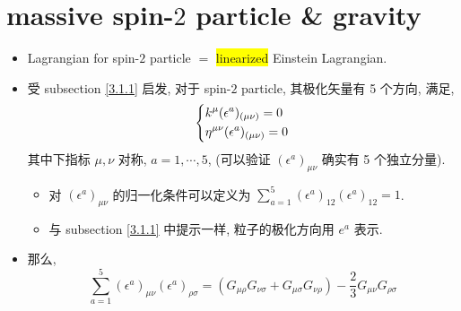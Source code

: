 \section{massive spin-\texorpdfstring{$2$}{2} particle \& gravity}
\begin{itemize}
	\item Lagrangian for spin-$2$ particle $=$ \colorbox{yellow}{linearized} Einstein Lagrangian.
	
	\item 受 subsection \ref{3.1.1} 启发, 对于 spin-$2$ particle, 其极化矢量有 5 个方向, 满足,
	\begin{equation} \label{3.2.1}
		\begin{dcases}
			k^\mu (\epsilon^a)_{(\mu \nu)} = 0 \\
			\eta^{\mu \nu} (\epsilon^a)_{(\mu \nu)} = 0
		\end{dcases}
	\end{equation}
	其中下指标 $\mu, \nu$ 对称, $a = 1, \cdots, 5$, (可以验证 $(\epsilon^a)_{\mu \nu}$ 确实有 5 个独立分量).
	\begin{itemize}
		\item 对 $(\epsilon^{a})_{\mu \nu}$ 的归一化条件可以定义为 $\sum_{a = 1}^5 (\epsilon^a)_{1 2} (\epsilon^a)_{1 2} = 1$.
		
		\item 与 subsection \ref{3.1.1} 中提示一样, 粒子的极化方向用 $e^a$ 表示.
	\end{itemize}
	
	\item 那么,
	\begin{equation}
		\sum_{a = 1}^5 (\epsilon^a)_{\mu \nu} (\epsilon^a)_{\rho \sigma} = (G_{\mu \rho} G_{\nu \sigma} + G_{\mu \sigma} G_{\nu \rho}) - \frac{2}{3} G_{\mu \nu} G_{\rho \sigma}
	\end{equation}
	

\end{itemize}
